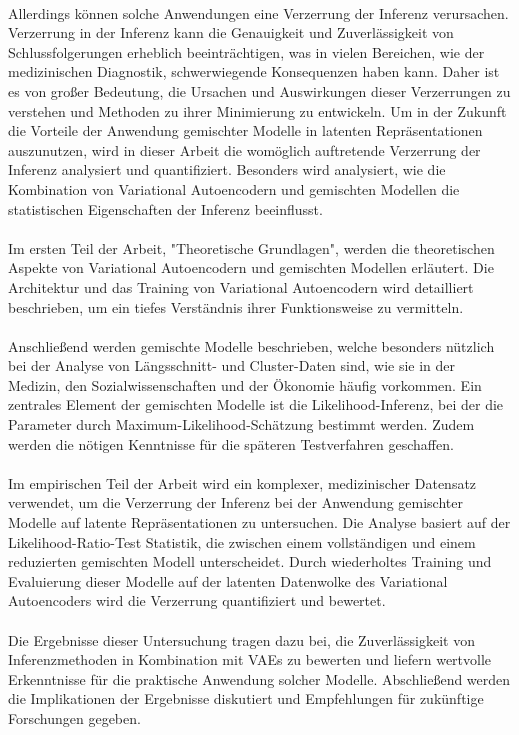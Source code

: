 \documentclass[%
thesis=student,%
coverpage=false,%
titlepage=false,%
headmarks=true, %
german,%
font=libertine, %
math=newpxtx, %
BCOR=5mm,%
coverBCOR=11mm%
]{tumbook}
\theoremstyle{break}
\begin{document}
\\
Allerdings können solche Anwendungen eine Verzerrung der Inferenz verursachen.
Verzerrung in der Inferenz kann die Genauigkeit und Zuverlässigkeit von Schlussfolgerungen erheblich beeinträchtigen, was in vielen Bereichen, wie der medizinischen Diagnostik, schwerwiegende Konsequenzen haben kann. Daher ist es von großer Bedeutung, die Ursachen und Auswirkungen dieser Verzerrungen zu verstehen und Methoden zu ihrer Minimierung zu entwickeln. Um in der Zukunft die Vorteile der Anwendung gemischter Modelle in latenten Repräsentationen auszunutzen, wird in dieser Arbeit die womöglich auftretende Verzerrung der Inferenz analysiert und quantifiziert. Besonders wird analysiert, wie die Kombination von Variational Autoencodern und gemischten Modellen die statistischen Eigenschaften der Inferenz beeinflusst. \\
\\
Im ersten Teil der Arbeit, "Theoretische Grundlagen",  werden die theoretischen Aspekte von Variational Autoencodern  und gemischten Modellen erläutert. Die Architektur und das Training von Variational Autoencodern wird detailliert beschrieben, um ein tiefes Verständnis ihrer Funktionsweise zu vermitteln.\\
\\
Anschließend werden gemischte Modelle beschrieben, welche besonders nützlich bei der Analyse von Längsschnitt- und Cluster-Daten sind, wie sie in der Medizin, den Sozialwissenschaften und der Ökonomie häufig vorkommen. Ein zentrales Element der gemischten Modelle ist die Likelihood-Inferenz, bei der die Parameter durch Maximum-Likelihood-Schätzung bestimmt werden. Zudem werden die nötigen Kenntnisse für die späteren Testverfahren geschaffen. \\
\\
Im empirischen Teil der Arbeit wird ein komplexer,  medizinischer Datensatz verwendet, um die Verzerrung der Inferenz bei der Anwendung gemischter Modelle auf latente Repräsentationen zu untersuchen. Die Analyse basiert auf der Likelihood-Ratio-Test Statistik, die zwischen einem vollständigen und einem reduzierten gemischten Modell unterscheidet. Durch wiederholtes Training und Evaluierung dieser Modelle auf der latenten Datenwolke des Variational Autoencoders wird die Verzerrung quantifiziert und bewertet.\\
\\
Die Ergebnisse dieser Untersuchung tragen dazu bei, die Zuverlässigkeit von Inferenzmethoden in Kombination mit VAEs zu bewerten und liefern wertvolle Erkenntnisse für die praktische Anwendung solcher Modelle. Abschließend werden die Implikationen der Ergebnisse diskutiert und Empfehlungen für zukünftige Forschungen gegeben.\\
\\
\end{document}
